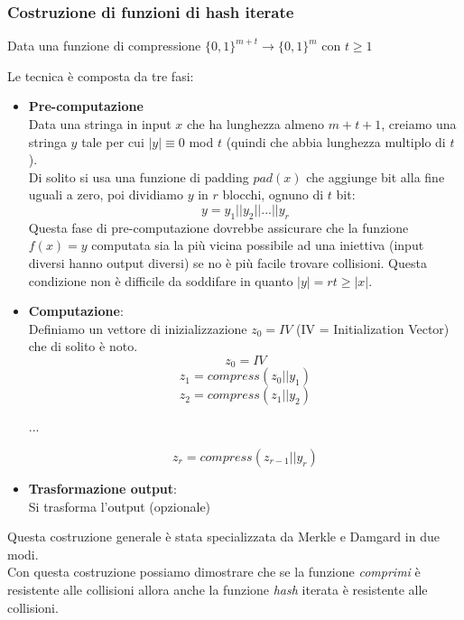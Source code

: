 \subsubsection*{Costruzione di funzioni di hash iterate}

Data una funzione di compressione $\{0,1\}^{m+t} \rightarrow \{0,1\}^m$ con $t \geq 1$

Le tecnica è composta da tre fasi:
\begin{itemize}
	\item \textbf{Pre-computazione}\\
	Data una stringa in input $x$ che ha lunghezza almeno $m+t+1$, creiamo una stringa $y$ tale per cui $|y| \equiv 0 $ mod $t$ (quindi che abbia lunghezza multiplo di $t$).\\
	Di solito si usa una funzione di padding $pad(x)$ che aggiunge bit alla fine uguali a zero, poi dividiamo $y$ in $r$ blocchi, ognuno di $t$ bit:
	\begin{equation*}
		y = y_1 || y_2 || ... || y_r
	\end{equation*}
Questa fase di pre-computazione dovrebbe assicurare che la funzione $f(x) = y$ computata sia la più vicina possibile ad una iniettiva (input diversi hanno output diversi) se no è più facile trovare collisioni. 
Questa condizione non è difficile da soddifare in quanto $|y| = rt \geq |x|$.

\item \textbf{Computazione}:\\
Definiamo un vettore di inizializzazione $z_0 = IV$ (IV = Initialization Vector) che di solito è noto.
\begin{equation*}
	z_0 = IV
\end{equation*}
\begin{equation*}
	z_1 = compress(z_0 || y_1)
\end{equation*}
\begin{equation*}
	z_2 = compress(z_1 || y_2)
\end{equation*}
\begin{center}
	...
\end{center}
\begin{equation*}
	z_r = compress(z_{r-1} || y_r)
\end{equation*}

\item \textbf{Trasformazione output}:\\
Si trasforma l'output (opzionale)
\end{itemize}

Questa costruzione generale è stata specializzata da Merkle e Damgard in due modi.\\
Con questa costruzione possiamo dimostrare che se la funzione \textit{comprimi} è resistente alle collisioni allora anche la funzione \textit{hash} iterata è resistente alle collisioni.\\


